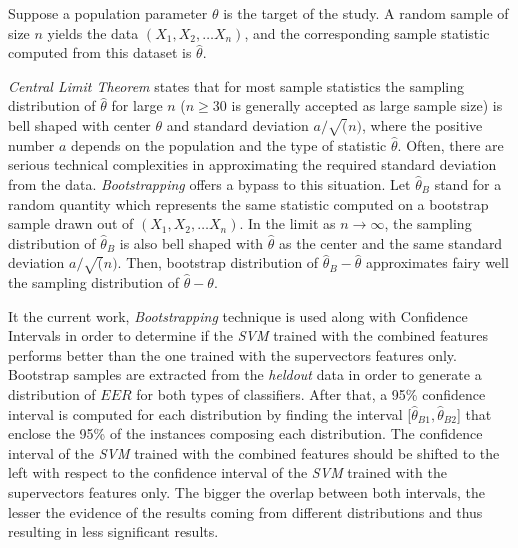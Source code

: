 Suppose a population parameter $\theta$ is the target of the study. A random sample
of size $n$ yields the data $(X_{1}, X_{2}, \dotsc X_{n})$, and the corresponding
sample statistic computed from this dataset is ${\hat{\theta}}$.

\textit{Central Limit Theorem} states that for most sample
statistics the sampling distribution of ${\hat{\theta}}$ for large $n$
($n \geq 30$ is generally accepted as large sample size) is bell shaped with
center $\theta$ and standard deviation $a / \sqrt(n)$, where the positive number $a$
depends on the population and the type of statistic ${\hat{\theta}}$.
Often, there are serious technical complexities in approximating the required
standard deviation from the data. \textit{Bootstrapping} offers a bypass to this situation.
Let ${\hat{\theta}}_{B}$ stand for a random quantity which represents the same statistic
computed on a bootstrap sample drawn out of $(X_{1}, X_{2}, \dotsc X_{n})$.
In the limit as $n \to \infty$, the sampling distribution of ${\hat{\theta}}_{B}$
is also bell shaped with ${\hat{\theta}}$ as the center and the same standard deviation
$a / \sqrt(n)$. Then, bootstrap distribution of $\hat{\theta}_{B} - \hat{\theta}$
approximates fairy well the sampling distribution of $\hat{\theta} - \theta$.

It the current work, \textit{Bootstrapping} technique is used along with Confidence
Intervals in order to determine if the \textit{SVM} trained with the combined features
performs better than the one trained with the supervectors features only.
Bootstrap samples are extracted from the \textit{heldout} data in order
to generate a distribution of $EER$ for both types of classifiers. After that,
a 95\% confidence interval is computed for each distribution by finding the interval
[$\hat{\theta}_{B1}, \hat{\theta}_{B2}$] that enclose the 95\% of the instances
composing each distribution. The confidence interval of the \textit{SVM} trained with
the combined features should be shifted to the left with respect to the confidence
interval of the \textit{SVM} trained with the supervectors features only.
The bigger the overlap between both intervals, the
lesser the evidence of the results coming from different distributions and thus
resulting in less significant results.
